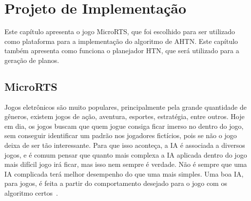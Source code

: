 
\chapter{\label{chap:proj}Projeto de Implementação}

Este capítulo apresenta o jogo MicroRTS, que foi escolhido para ser utilizado como plataforma para a implementação do algoritmo de AHTN. Este capítulo também apresenta como funciona o planejador HTN, que será utilizado para a geração de planos.

\section{MicroRTS}  \label{sec:microrts}

Jogos eletrônicos são muito populares, principalmente pela grande quantidade de gêneros, existem jogos de ação, aventura, esportes, estratégia, entre outros. Hoje em dia, os jogos buscam que quem jogue consiga ficar imerso no dentro do jogo, sem conseguir identificar um padrão nos jogadores fictícios, pois se não o jogo deixa de ser tão interessante. Para que isso aconteça, a IA é associada a diversos jogos, e é comum pensar que quanto mais complexa a IA aplicada dentro do jogo mais difícil jogo irá ficar, mas isso nem sempre é verdade. Não é sempre que uma IA complicada terá melhor desempenho do que uma mais simples. Uma boa IA, para jogos, é feita a partir do comportamento desejado para o jogo com os algoritmo certos~\cite{millington2009artificial}.


